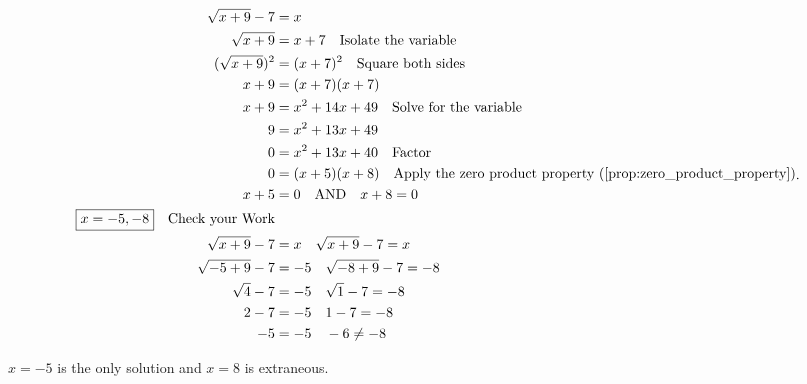 \begin{equation}
  \label{eqt:solving_radical_equations_with_variables_outside_the_radical}
  \begin{split}
    \sqrt{x + 9} - 7 &= x \\
    \sqrt{x + 9} &= x + 7 \quad \textrm{Isolate the variable} \\
    (\sqrt{x + 9})^{2} &= (x + 7)^{2} \quad \textrm{Square both sides} \\
    x + 9 &= (x + 7)(x + 7) \\
    x + 9 &= x^{2} + 14x + 49 \quad \textrm{Solve for the variable} \\
    9 &= x^{2} + 13x + 49 \\
    0 &= x^{2} + 13x + 40 \quad \textrm{Factor} \\
    0 &= (x + 5)(x + 8) \quad \textrm{Apply the zero product property
      (\ref{prop:zero_product_property}}) \\
    x + 5 &= 0 \quad \textrm{AND} \quad x + 8 = 0 \\
    \boxed{x = -5, -8} \quad \textrm{Check your Work} \\
    \sqrt{x + 9} - 7 &= x \quad \sqrt{x + 9} - 7 = x \\
    \sqrt{-5 + 9} - 7 &= -5 \quad \sqrt{-8 + 9} - 7 = -8 \\
    \sqrt{4} - 7 &= -5 \quad \sqrt{1} - 7 = -8 \\
    2 - 7 &= -5 \quad 1 - 7 = -8 \\
    -5 &= -5 \quad -6 \ne -8 \\
  \end{split}
.\end{equation}

$x = -5$ is the only solution and $x = 8$ is extraneous.


\newpage
